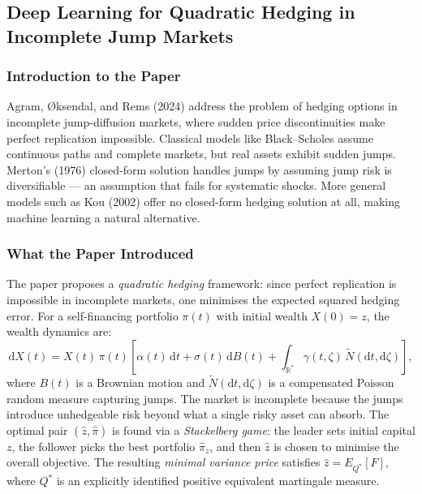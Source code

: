 \documentclass[12pt,a4paper]{article}
\begin{document}
\subsection*{Deep Learning for Quadratic Hedging in Incomplete Jump Markets}

\subsubsection*{Introduction to the Paper}

Agram, \O ksendal, and Rems (2024) address the problem of hedging options in incomplete jump-diffusion markets, where sudden price discontinuities make perfect replication impossible. Classical models like Black--Scholes assume continuous paths and complete markets, but real assets exhibit sudden jumps. Merton's (1976) closed-form solution handles jumps by assuming jump risk is diversifiable --- an assumption that fails for systematic shocks. More general models such as Kou (2002) offer no closed-form hedging solution at all, making machine learning a natural alternative.

\subsubsection*{What the Paper Introduced}

The paper proposes a \textit{quadratic hedging} framework: since perfect replication is impossible in incomplete markets, one minimises the expected squared hedging error. For a self-financing portfolio $\pi(t)$ with initial wealth $X(0)=z$, the wealth dynamics are:
\begin{equation}
    \mathrm{d}X(t) = X(t)\,\pi(t)\!\left[\alpha(t)\,\mathrm{d}t + \sigma(t)\,\mathrm{d}B(t) + \int_{\mathbb{R}^{*}} \gamma(t,\zeta)\,\widetilde{N}(\mathrm{d}t,\mathrm{d}\zeta)\right],
\end{equation}
where $B(t)$ is a Brownian motion and $\widetilde{N}(\mathrm{d}t,\mathrm{d}\zeta)$ is a compensated Poisson random measure capturing jumps. The market is incomplete because the jumps introduce unhedgeable risk beyond what a single risky asset can absorb. The optimal pair $(\hat{z},\hat{\pi})$ is found via a \textit{Stackelberg game}: the leader sets initial capital $z$, the follower picks the best portfolio $\hat{\pi}_z$, and then $\hat{z}$ is chosen to minimise the overall objective. The resulting \textit{minimal variance price} satisfies $\hat{z} = E_{Q^*}[F]$, where $Q^*$ is an explicitly identified positive equivalent martingale measure.
\end{document}

